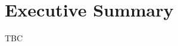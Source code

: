\documentclass[11pt]{article}
\begin{document}
\section*{Executive Summary}
TBC

\newpage
\tableofcontents
\newpage
\listoffigures
\listoftables

\newpage


\newpage


\newpage


\newpage


\newpage


\newpage
%


\end{document}

